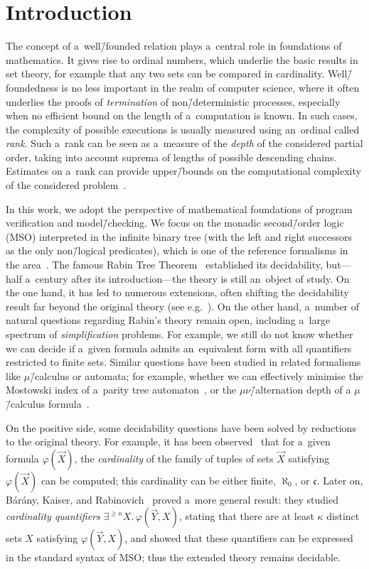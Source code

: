 \documentclass[11pt,a4paper]{amsart}
\theoremstyle{plain}
\theoremstyle{definition}
\theoremstyle{defC}
\theoremstyle{thmC}
\theoremstyle{plain}
\numberwithin{equation}{section}
\numberwithin{equation}{section}
\numberwithin{figure}{section}
\begin{document}
\section{Introduction}
\label{sec:intro}

The concept of a~well\=/founded relation plays a~central role in foundations of mathematics.
It gives rise to ordinal numbers, which underlie the basic results in set theory, for example that any two sets can be compared in cardinality.
Well\=/foundedness is no less important in the realm of computer science, where it often underlies the proofs of \emph{termination} of non\=/deterministic processes,
especially when no efficient bound on the length of a~computation is known.
In such cases, the complexity of possible executions is usually measured using an~ordinal called \emph{rank}.
Such a~rank can be seen as a~measure of the \emph{depth} of the considered partial order, taking into account suprema of lengths of possible descending chains.
Estimates on a~rank can provide upper\=/bounds on the computational complexity of the considered problem~\cite{schmitz_hab}.

In this work, we adopt the perspective of mathematical foundations of program verification and model\=/checking.
We focus on the monadic second\=/order logic (MSO) interpreted in the
infinite binary tree (with the left and right successors as the only
non\=/logical predicates), which is one of the reference formalisms in the area~\cite{thomas_languages}.
The famous Rabin Tree Theorem~\cite{rabin_s2s} established its decidability, but---half a~century after its introduction---the theory is still an~object of study.
On the one hand, it has led to numerous extensions, often shifting the decidability result far beyond the original theory (see e.g.~\cite{bojanczyk_wmso_u_p,ong_model_checking_higher_order}).
On the other hand, a~number of natural questions regarding Rabin's theory remain open, including a~large spectrum of \emph{simplification} problems.
For example, we still do not know whether we can decide if a~given formula admits an~equivalent form with all quantifiers restricted to finite sets.
Similar questions have been studied in related formalisms like $\mu$\=/calculus or automata;
for example, whether we can effectively minimise the Mostowski index of a~parity tree automaton~\cite{loding_index_to_bounds,murlak_game_auto},
or the $\mu \nu $\=/alternation depth of a $\mu$\=/calculus formula~\cite{bradfield_simplifying}.

On the positive side, some decidability questions have been solved by reductions to the original theory.
For example, it has been observed~\cite{niwinski_cardinality} that for a~given formula $\varphi(\vec{X})$,
the \emph{cardinality} of the family of tuples of sets $\vec{X}$ satisfying $\varphi(\vec{X})$ can be computed;
this cardinality can be either finite, $\aleph_0$, or $\mathfrak c$.
Later on, B\'ar\'any, Kaiser, and Rabinovich~\cite{barany_expressing_trees} proved a~more general result: they studied \emph{cardinality quantifiers} $\exists^{\geq \kappa} X.\, \varphi(\vec{Y}, X)$,
stating that there are at least $\kappa$ distinct sets $X$ satisfying $\varphi(\vec{Y}, X)$, and showed that these quantifiers can be expressed in the standard syntax of MSO;
thus the extended theory remains decidable.
\end{document}
